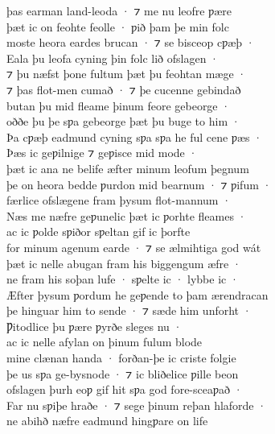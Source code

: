 \documentclass[10pt]{book}
\begin{document}
\settowidth{}

\begin{center}
\parbox{\pagelen}{
þas earman land-leoda · ⁊ me nu leofre ƿ\ae{}re \\
þ\ae{}t ic on feohte feolle · ƿið þam þe min folc \\
moste heora eardes brucan · ⁊ se bisceop cƿ\ae{}þ · \\
Eala þu leofa cyning þin folc lið ofslagen · \\
⁊ þu n\ae{}fst þone fultum þ\ae{}t þu feohtan m\ae{}ge · \\
⁊ þas flot-men cumað · ⁊ þe cucenne gebindað \\
butan þu mid fleame þinum feore gebeorge · \\
oððe þu þe sƿa gebeorge þ\ae{}t þu buge to him · \\
Þa cƿ\ae{}þ eadmund cyning sƿa sƿa he ful cene ƿ\ae{}s · \\
Þ\ae{}s ic geƿilnige ⁊ geƿisce mid mode · \\
þ\ae{}t ic ana ne belife \ae{}fter minum leofum þegnum \\
þe on heora bedde ƿurdon mid bearnum · ⁊ ƿifum · \\
f\ae{}rlice ofsl\ae{}gene fram þysum flot-mannum · \\
N\ae{}s me n\ae{}fre geƿunelic þ\ae{}t ic ƿorhte fleames · \\
ac ic ƿolde sƿiðor sƿeltan gif ic þorfte \\
for minum agenum earde · ⁊ se \ae{}lmihtiga god w\'at \\
þ\ae{}t ic nelle abugan fram his biggengum \ae{}fre · \\
ne fram his soþan lufe · sƿelte ic · lybbe ic · \\
\AE{}fter þysum ƿordum he geƿende to þam \ae{}rendracan \\
þe hinguar him to sende · ⁊ s\ae{}de him unforht · \\
Ƿitodlice þu ƿ\ae{}re ƿyrðe sleges nu · \\
ac ic nelle afylan on þinum fulum blode \\
mine cl\ae{}nan handa · forðan-þe ic criste folgie \\
þe us sƿa ge-bysnode · ⁊ ic bliðelice ƿille beon \\
ofslagen þurh eoƿ gif hit sƿa god fore-sceaƿað · \\
Far nu sƿiþe hraðe · ⁊ sege þinum reþan hlaforde · \\ 
ne abihð n\ae{}fre eadmund hingƿare on life \\
}
\end{center}
\end{document}
